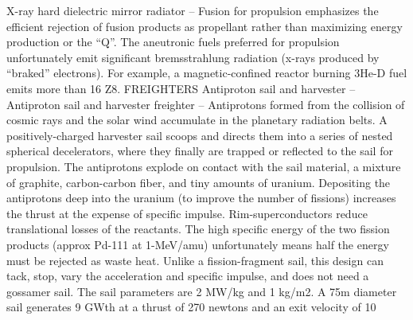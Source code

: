 \documentclass[a4paper]{book}
\begin{document}
X-ray hard dielectric mirror radiator – Fusion for propulsion emphasizes the efficient rejection of fusion products as propellant rather than maximizing energy production or the “Q”. The aneutronic fuels preferred for propulsion unfortunately emit significant bremsstrahlung radiation (x-rays produced by “braked” electrons). For example, a magnetic-confined reactor burning 3He-D fuel emits more than 16%
Z8. FREIGHTERS
Antiproton sail and harvester – Antiproton sail and harvester freighter – Antiprotons formed from the collision of cosmic rays and the solar wind accumulate in the planetary radiation belts. A positively-charged harvester sail scoops and directs them into a series of nested spherical decelerators, where they finally are trapped or reflected to the sail for propulsion. The antiprotons explode on contact with the sail material, a mixture of graphite, carbon-carbon fiber, and tiny amounts of uranium. Depositing the antiprotons deep into the uranium (to improve the number of fissions) increases the thrust at the expense of specific impulse. Rim-superconductors reduce translational losses of the reactants. The high specific energy of the two fission products (approx Pd-111 at 1-MeV/amu) unfortunately means half the energy must be rejected as waste heat. Unlike a fission-fragment sail, this design can tack, stop, vary the acceleration and specific impulse, and does not need a gossamer sail. The sail parameters are 2 MW/kg and 1 kg/m2. A 75m diameter sail generates 9 GWth at a thrust of 270 newtons and an exit velocity of 10%
 
\end{document}
